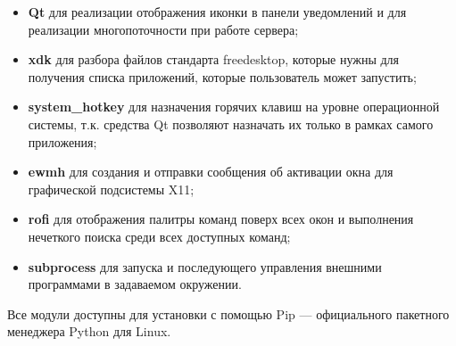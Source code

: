 \begin{itemize}
	\item \textbf{Qt} для реализации отображения иконки в панели уведомлений
		и для реализации многопоточности при работе сервера;
	\item \textbf{xdk} для разбора файлов стандарта freedesktop, которые нужны
		для получения списка приложений, которые пользователь может запустить;
	\item \textbf{system\_hotkey} для назначения горячих клавиш на уровне
		операционной системы, т.к. средства Qt позволяют назначать их только
		в рамках самого приложения;
	\item \textbf{ewmh} для создания и отправки сообщения об активации окна для
		графической подсистемы X11;
	\item \textbf{rofi} для отображения палитры команд поверх всех окон и
		выполнения нечеткого поиска среди всех доступных команд;
	\item \textbf{subprocess} для запуска и последующего управления внешними
		программами в задаваемом окружении.
\end{itemize}

Все модули доступны для установки с помощью Pip — официального пакетного
менеджера Python для Linux.

